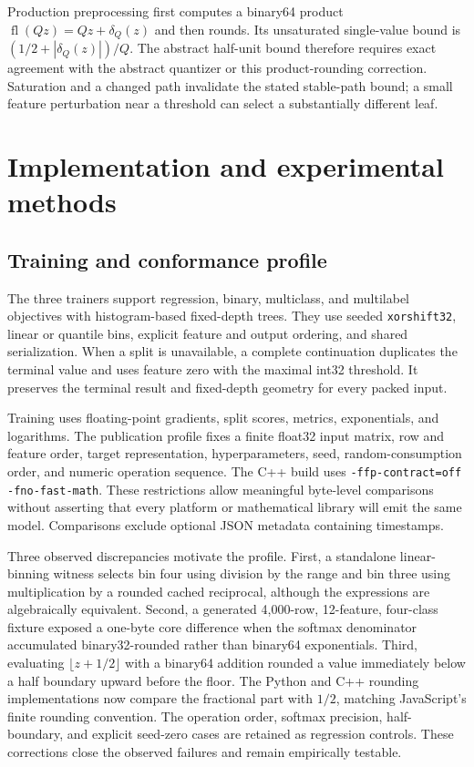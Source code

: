 \documentclass{ledger}
\newcommand{\codeword}[1]{\texttt{#1}}
\begin{document}
Production preprocessing first computes a binary64 product
$\operatorname{fl}(Qz)=Qz+\delta_Q(z)$ and then rounds. Its unsaturated
single-value bound is $(1/2+|\delta_Q(z)|)/Q$. The abstract half-unit bound
therefore requires exact agreement with the abstract quantizer or this
product-rounding correction. Saturation and a changed path invalidate the
stated stable-path bound; a small feature perturbation near a threshold can
select a substantially different leaf.

\section{Implementation and experimental methods}
\label{sec:methods}

\subsection{Training and conformance profile}

The three trainers support regression, binary, multiclass, and multilabel
objectives with histogram-based fixed-depth trees. They use seeded
\codeword{xorshift32}, linear or quantile bins, explicit feature and output
ordering, and shared serialization. When a split is unavailable, a complete
continuation duplicates the terminal value and uses feature zero with the
maximal int32 threshold. It preserves the terminal result and fixed-depth
geometry for every packed input.

Training uses floating-point gradients, split scores, metrics, exponentials,
and logarithms. The publication profile fixes a finite float32 input matrix,
row and feature order, target representation, hyperparameters, seed,
random-consumption order, and numeric operation sequence. The C++ build uses
\codeword{-ffp-contract=off -fno-fast-math}. These restrictions allow
meaningful byte-level comparisons without asserting that every platform or
mathematical library will emit the same model. Comparisons exclude optional
JSON metadata containing timestamps.

Three observed discrepancies motivate the profile. First, a standalone linear-binning
witness selects bin four using division by the range and bin three using
multiplication by a rounded cached reciprocal, although the expressions are
algebraically equivalent. Second, a generated
4,000-row, 12-feature, four-class fixture exposed a one-byte core difference
when the softmax denominator accumulated binary32-rounded rather than
binary64 exponentials. Third, evaluating $\lfloor z+1/2\rfloor$ with a
binary64 addition rounded a value immediately below a half boundary upward
before the floor. The Python and C++ rounding implementations now compare the
fractional part with $1/2$, matching JavaScript's finite rounding convention.
The operation order, softmax precision, half-boundary, and explicit seed-zero
cases are retained as regression controls. These corrections close the
observed failures and remain empirically testable.
\end{document}
